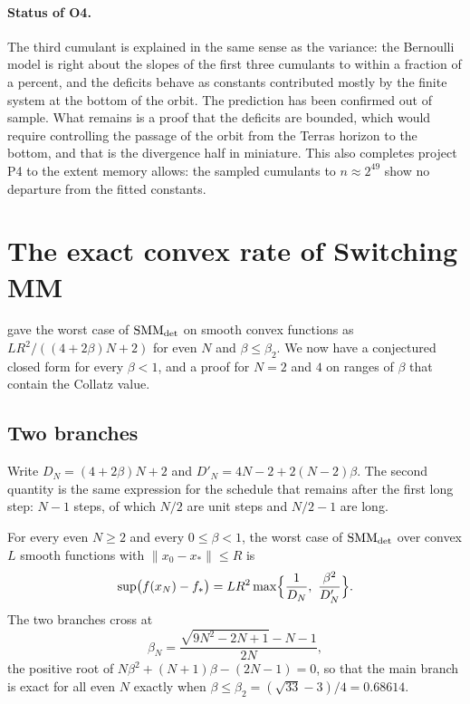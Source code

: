 \paragraph{Status of O4.} The third cumulant is explained in the same sense as
the variance: the Bernoulli model is right about the slopes of the first three
cumulants to within a fraction of a percent, and the deficits behave as constants
contributed mostly by the finite system at the bottom of the orbit. The prediction
has been confirmed out of sample. What remains is a proof that the deficits
are bounded, which would require controlling the passage of the orbit from
the Terras horizon to the bottom, and that is the divergence half in
miniature. This also completes project P4 to the extent memory allows: the
sampled cumulants to $n\approx2^{49}$ show no departure from the fitted
constants.

\section{The exact convex rate of Switching MM}\label{sec:ch16:p11}

 gave the worst case of $\mathrm{SMM}_{\mathrm{det}}$ on smooth convex
functions as $LR^2/((4+2\beta)N+2)$ for even $N$ and $\beta\le\beta_2$. We now
have a conjectured closed form for every $\beta<1$, and a proof for $N=2$ and $4$ on ranges of $\beta$ that contain the Collatz value.

\subsection{Two branches}

Write $D_N=(4+2\beta)N+2$ and $D'_N=4N-2+2(N-2)\beta$. The second quantity is
the same expression for the schedule that remains after the first long step:
$N-1$ steps, of which $N/2$ are unit steps and $N/2-1$ are long.

\begin{conjecture}\label{conj:ch16:full}
For every even $N\ge2$ and every $0\le\beta<1$, the worst case of $\mathrm{SMM}_{\mathrm{det}}$ over
convex $L$ smooth functions with $\|x_0-x_*\|\le R$ is
\[
  \sup\bigl(f(x_N)-f_*\bigr)=LR^2\max\Bigl\{\frac1{D_N},\ \frac{\beta^2}{D'_N}\Bigr\}.
\]
The two branches cross at
\[
  \beta_N=\frac{\sqrt{9N^2-2N+1}-N-1}{2N},
\]
the positive root of $N\beta^2+(N+1)\beta-(2N-1)=0$, so that the main branch is
exact for all even $N$ exactly when $\beta\le\beta_2=(\sqrt{33}-3)/4=0.68614$.
\end{conjecture}

